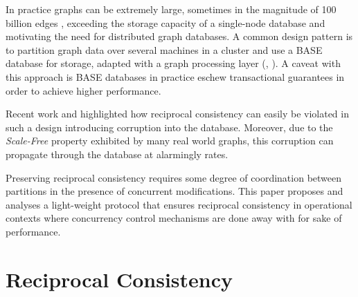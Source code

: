 \documentclass[sigplan,10pt]{acmart}
\begin{document}
In practice graphs can be extremely large, sometimes in the magnitude of 100 billion edges \cite{Sahu2017}, exceeding the storage capacity of a single-node database and motivating the need for distributed graph databases. A common design pattern is to partition graph data over several machines in a cluster and use a BASE database \cite{Pritchett2008} for storage, adapted with a graph processing layer (\cite{janusgraph}, \cite{TitanDB}). A caveat with this approach is BASE databases in practice eschew transactional guarantees in order to achieve higher performance.

Recent work \cite{Ezhilchelvan2018} and \cite{Webber2019} highlighted how reciprocal consistency can easily be violated in such a design introducing corruption into the database. Moreover, due to the \emph{Scale-Free} \cite{ScaleFree} property exhibited by many real world graphs, this corruption can propagate through the database at alarmingly rates.

Preserving reciprocal consistency requires some degree of coordination between partitions in the presence of concurrent modifications. This paper proposes and analyses a light-weight protocol that ensures reciprocal consistency in operational contexts where concurrency control mechanisms are done away with for sake of performance.



\section{Reciprocal Consistency}
\label{sec:recipr-cons}
\end{document}
